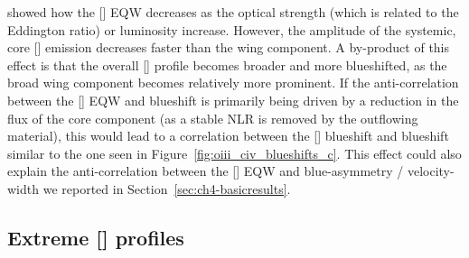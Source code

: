 \citet{shen14} showed how the [] EQW decreases as the optical  strength (which is related to the Eddington ratio) or luminosity increase. 
However, the amplitude of the systemic, core [] emission decreases faster than the wing component.
A by-product of this effect is that the overall [] profile becomes broader and more blueshifted, as the broad wing component becomes relatively more prominent.
If the anti-correlation between the [] EQW and  blueshift is primarily being driven by a reduction in the flux of the core component (as a stable NLR is removed by the outflowing material), this would lead to a correlation between the [] blueshift and  blueshift similar to the one seen in Figure~\ref{fig:oiii_civ_blueshifts_c}. 
This effect could also explain the anti-correlation between the [] EQW and blue-asymmetry / velocity-width we reported in Section~\ref{sec:ch4-basicresults}. 

\subsection{Extreme [] profiles}
\label{sec:extreme_oiii}

